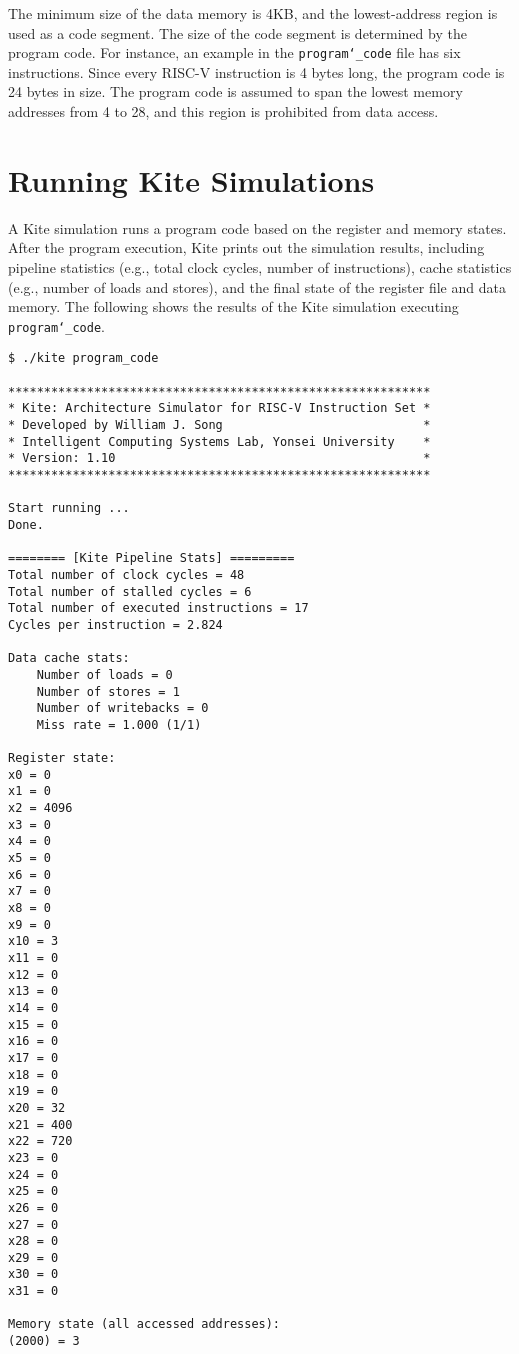 \documentclass[10pt]{article}
\begin{document}
The minimum size of the data memory is 4KB, and the lowest-address region is used as a code segment.
The size of the code segment is determined by the program code.
For instance, an example in the {\tt\small program\char`_code} file has six instructions.
Since every RISC-V instruction is 4 bytes long, the program code is 24 bytes in size.
The program code is assumed to span the lowest memory addresses from 4 to 28, and this region is prohibited from data access.


\section{Running Kite Simulations} \label{sec:running}
A Kite simulation runs a program code based on the register and memory states.
After the program execution, Kite prints out the simulation results, including pipeline statistics (e.g., total clock cycles, number of instructions), cache statistics (e.g., number of loads and stores), and the final state of the register file and data memory.
The following shows the results of the Kite simulation executing {\tt program\char`_code}.

\begin{Verbatim}[frame=single]
$ ./kite program_code

***********************************************************
* Kite: Architecture Simulator for RISC-V Instruction Set *
* Developed by William J. Song                            *
* Intelligent Computing Systems Lab, Yonsei University    *
* Version: 1.10                                           *
***********************************************************

Start running ...
Done.

======== [Kite Pipeline Stats] =========
Total number of clock cycles = 48
Total number of stalled cycles = 6
Total number of executed instructions = 17
Cycles per instruction = 2.824

Data cache stats:
    Number of loads = 0
    Number of stores = 1
    Number of writebacks = 0
    Miss rate = 1.000 (1/1)

Register state:
x0 = 0
x1 = 0
x2 = 4096
x3 = 0
x4 = 0
x5 = 0
x6 = 0
x7 = 0
x8 = 0
x9 = 0
x10 = 3
x11 = 0
x12 = 0
x13 = 0
x14 = 0
x15 = 0
x16 = 0
x17 = 0
x18 = 0
x19 = 0
x20 = 32
x21 = 400
x22 = 720
x23 = 0
x24 = 0
x25 = 0
x26 = 0
x27 = 0
x28 = 0
x29 = 0
x30 = 0
x31 = 0

Memory state (all accessed addresses):
(2000) = 3
\end{Verbatim}
\end{document}
